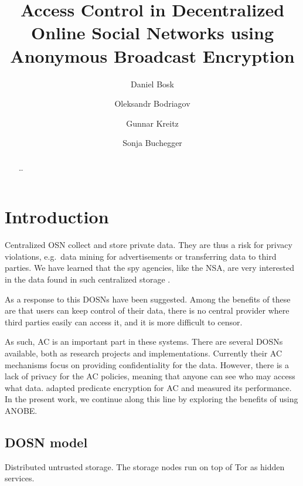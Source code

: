 \author{%
  Daniel Bosk \and
  Oleksandr Bodriagov \and
  Gunnar Kreitz \and
  Sonja Buchegger
}
\title{%
  Access Control in
  Decentralized Online Social Networks using
  Anonymous Broadcast Encryption
}

\maketitle
\begin{abstract}
  \dots
\end{abstract}

\acresetall
\section{Introduction}

Centralized \ac{OSN} collect and store private data.
They are thus a risk for privacy violations, e.g.~data mining for 
advertisements or transferring data to third parties.
We have learned that the spy agencies, like the \ac{NSA}, are very interested 
in the data found in such centralized storage \cite{prism}.

As a response to this \acp{DOSN} have been suggested.
Among the benefits of these are that users can keep control of their data, 
there is no central provider where third parties easily can access it, and it 
is more difficult to censor.

As such, \ac{AC} is an important part in these systems.
There are several \acp{DOSN} available, both as research projects and 
implementations.
Currently their \ac{AC} mechanisms focus on providing confidentiality for the 
data.
However, there is a lack of privacy for the \ac{AC} policies, meaning that 
anyone can see who may access what data.
\citet{predicateac} adapted predicate encryption for \ac{AC} and measured its 
performance.
In the present work, we continue along this line by exploring the benefits of 
using \ac{ANOBE}.

\subsection{\acs{DOSN} model}

Distributed untrusted storage.
The storage nodes run on top of Tor \cite{tor} as hidden services.

